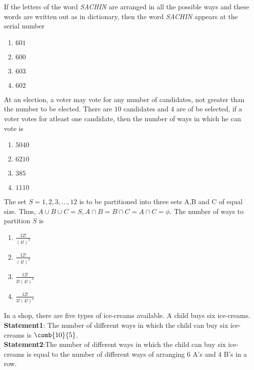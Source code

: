\item If the letters of the word \emph{SACHIN} are arranged in all the possible ways and these words are written out as in dictionary, then the word \emph{SACHIN} appears at the serial number \hfill {}
	\begin{multicols}{4}
		\begin{enumerate}
     \item $601$
     \item $600$
     \item $603$
     \item $602$
 \end{enumerate}
	\end{multicols}
\item At an election, a voter may vote for any number of candidates, not greater than the number to be elected. There are $10$ candidates and $4$ are of be selected, if a voter votes for atleast one candidate, then the number of ways in which he can vote is \hfill{}
	\begin{multicols}{4}
        \begin{enumerate}
 \item $5040$
 \item $6210$
 \item $385$
 \item $1110$
        \end{enumerate}
	\end{multicols}
\item The set $S={1,2,3,...,12}$ is to be partitioned into three sets A,B and C of equal size. Thus, $A \cup B \cup C = S, A \cap B = B \cap C = A \cap C = \phi $. The number of ways to partition $S$ is \hfill{}
	\begin{multicols}{2}
	\begin{enumerate}
     \item $ \frac{12!}{(4!)^3}$
     \item $\frac{12!}{(4!)^4}$
     \item $\frac{12!}{3!(4!)^3}$
     \item $\frac{12!}{3!(4!)^4}$
        \end{enumerate}
	\end{multicols}
\item In a shop, there are five types of ice-creams available. A child buys six ice-creams.\\\textbf{Statement1}: The number of different ways in which the child can buy six ice-creams is $ \comb{10}{5} $.\\\textbf{Statement2}:The number of different ways in which the child can buy six ice-creams is equal to the number of different ways of arranging 6 A's and 4 B's in a row. \hfill{}
